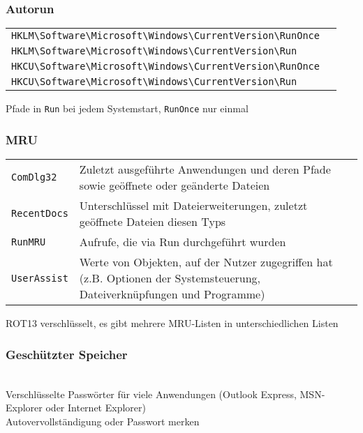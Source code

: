 \subsubsection{Autorun}
\begin{tabular}{@{}p{\the\MyLen}%
		@{}p{\linewidth-\the\MyLen}@{}}
	\texttt{HKLM\textbackslash Software\textbackslash Microsoft\textbackslash Windows\textbackslash CurrentVersion\textbackslash RunOnce} & \\
	\texttt{HKLM\textbackslash Software\textbackslash Microsoft\textbackslash Windows\textbackslash CurrentVersion\textbackslash Run} & \\
	\texttt{HKCU\textbackslash Software\textbackslash Microsoft\textbackslash Windows\textbackslash CurrentVersion\textbackslash RunOnce} & \\
	\texttt{HKCU\textbackslash Software\textbackslash Microsoft\textbackslash Windows\textbackslash CurrentVersion\textbackslash Run} & \\
\end{tabular}
Pfade in \texttt{Run} bei jedem Systemstart, \texttt{RunOnce} nur einmal

\subsubsection{MRU}
\texttt{}
\begin{tabular}{@{}p{\the\MyLen}%
		@{}p{\linewidth-\the\MyLen}@{}}
	\texttt{ComDlg32} & Zuletzt ausgeführte Anwendungen und deren Pfade sowie geöffnete oder geänderte Dateien\\
	 \texttt{RecentDocs} & Unterschlüssel mit Dateierweiterungen, zuletzt geöffnete Dateien diesen Typs\\
	 \texttt{RunMRU} & Aufrufe, die via Run durchgeführt wurden\\
	 \texttt{UserAssist} & Werte von Objekten, auf der Nutzer zugegriffen hat (z.B. Optionen der Systemsteuerung, Dateiverknüpfungen und Programme)
\end{tabular}
ROT13 verschlüsselt, es gibt mehrere MRU-Listen in unterschiedlichen Listen

\subsubsection{Geschützter Speicher}
\texttt{}\\
Verschlüsselte Passwörter für viele Anwendungen (Outlook Express, MSN-Explorer oder Internet Explorer)\\
Autovervollständigung oder Passwort merken\\

